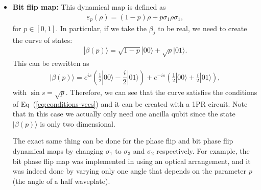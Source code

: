 \documentclass[10pt,letterpaper]{article} %
\newcommand{\eref}[1]{Eq~(\ref{#1})}
\begin{document}
\begin{itemize}
\item \textbf{Bit flip map:} 
This dynamical map is defined as
\begin{align*}
\varepsilon_p(\rho) = (1-p)\rho + p\sigma_1 \rho \sigma_1,
\end{align*}
for $p \in [0,1]$. 
In particular, if we take the $\beta_j$ to be real,
we need to create the curve of states:
\begin{align*}
|\beta(p)\rangle = \sqrt{1-p} |00\rangle +\sqrt{p} |01\rangle.
\end{align*}
This can be rewritten as
\begin{align*}
|\beta(p) \rangle = e^{is}  \left(\frac{1}{2} |00\rangle - \dfrac{i}{2} |01\rangle \right) + e^{-is} \left( \frac{1}{2} |00\rangle + \frac{i}{2} |01\rangle \right),
\end{align*}
with $\sin s= \sqrt{p}$.
Therefore, we can see that the curve satisfies the conditions of  \eref{eq:conditions-vecs} 
and it can be created with a 1PR circuit.
Note that in this case we actually only need one ancilla qubit
since the state $|\beta(p)\rangle$ is only two dimensional.

The exact same thing can be done
for the phase flip and bit phase flip dynamical maps by
changing $\sigma_1$ to
$\sigma_3$ and $\sigma_2$ respectively.
For example, the bit phase flip map was implemented in \cite{Andrea, Andrea_4qb} 
using an optical arrangement, and  it was indeed done 
by varying only one angle that depends on the parameter $p$ (the angle of a half waveplate). 

\end{itemize}
\end{document}
